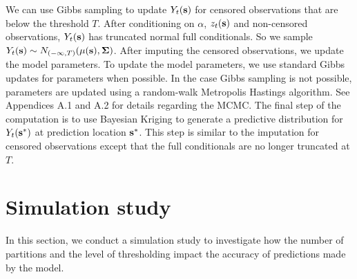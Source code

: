 \documentclass[11pt]{article}
\begin{document}
We can use Gibbs sampling to update $Y_t(\mbox{\bf s})$ for censored observations that are below the threshold $T$.
After conditioning on $\alpha$, $z_t(\mbox{\bf s})$ and non-censored observations, $Y_t(\mbox{\bf s})$ has truncated normal full conditionals.
So we sample $Y_t(\mbox{\bf s}) \sim N_{(-\infty, T)}(\mu(\mbox{\bf s}), \mbox{\boldmath $\Sigma$})$.
After imputing the censored observations, we update the model parameters.
To update the model parameters, we use standard Gibbs updates for parameters when possible.
In the case Gibbs sampling is not possible, parameters are updated using a random-walk Metropolis Hastings algorithm.
See Appendices A.1 and A.2 for details regarding the MCMC.
The final step of the computation is to use Bayesian Kriging to generate a predictive distribution for $Y_t(\mbox{\bf s}^*)$ at prediction location $\mbox{\bf s}^*$.
This step is similar to the imputation for censored observations except that the full conditionals are no longer truncated at $T$.

\section{Simulation study}\label{s:simstudy}
In this section, we conduct a simulation study to investigate how the number of partitions and the level of thresholding impact the accuracy of predictions made by the model.
\end{document}

